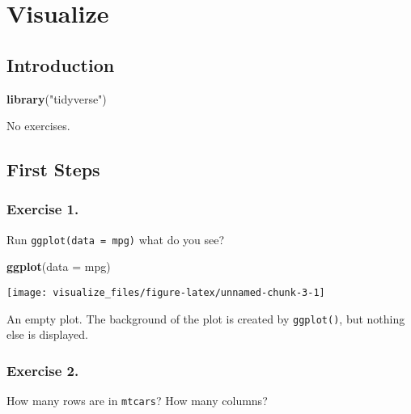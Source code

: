 \documentclass[]{book}
\newenvironment{Shaded}{\begin{snugshade}}{\end{snugshade}}
\newcommand{\DataTypeTok}[1]{\textcolor[rgb]{0.13,0.29,0.53}{#1}}
\newcommand{\KeywordTok}[1]{\textcolor[rgb]{0.13,0.29,0.53}{\textbf{#1}}}
\newcommand{\NormalTok}[1]{#1}
\newcommand{\StringTok}[1]{\textcolor[rgb]{0.31,0.60,0.02}{#1}}
\theoremstyle{plain}
\theoremstyle{remark}
\theoremstyle{definition}
\theoremstyle{definition}
\theoremstyle{definition}
\theoremstyle{remark}
\begin{document}
\hypertarget{visualize}{%
\chapter{Visualize}\label{visualize}}

\hypertarget{introduction-1}{%
\section{Introduction}\label{introduction-1}}

\begin{Shaded}
\begin{Highlighting}[]
\KeywordTok{library}\NormalTok{(}\StringTok{"tidyverse"}\NormalTok{)}
\end{Highlighting}
\end{Shaded}

No exercises.

\hypertarget{first-steps}{%
\section{First Steps}\label{first-steps}}

\hypertarget{exercise-1.}{%
\subsection{Exercise 1.}\label{exercise-1.}}

Run \texttt{ggplot(data\ =\ mpg)} what do you see?

\begin{Shaded}
\begin{Highlighting}[]
\KeywordTok{ggplot}\NormalTok{(}\DataTypeTok{data =}\NormalTok{ mpg)}
\end{Highlighting}
\end{Shaded}

\begin{center}\texttt{[image: visualize\_files/figure-latex/unnamed-chunk-3-1]} \end{center}

An empty plot. The background of the plot is created by
\texttt{ggplot()}, but nothing else is displayed.

\hypertarget{exercise-2.}{%
\subsection{Exercise 2.}\label{exercise-2.}}

How many rows are in \texttt{mtcars}? How many columns?
\end{document}
